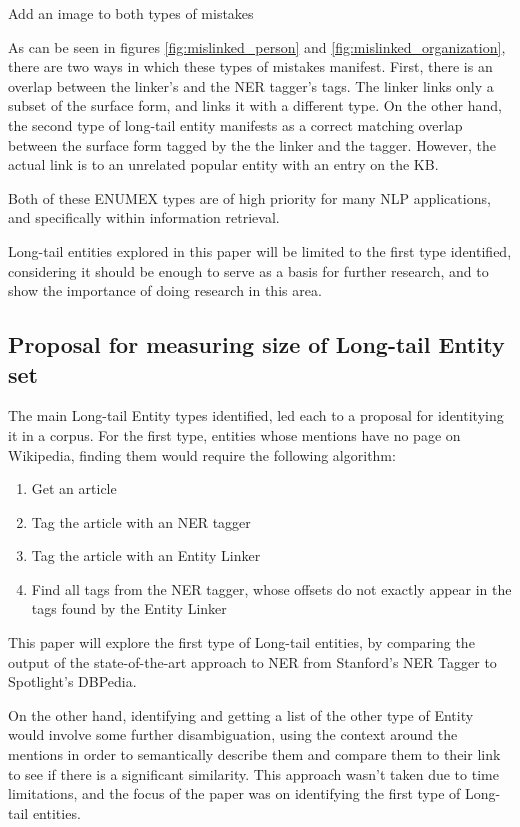 \todo Add an image to both types of mistakes

As can be seen in figures \ref{fig:mislinked_person} and \ref{fig:mislinked_organization}, there are two ways in which these types of mistakes manifest.
First, there is an overlap between the linker's and the NER tagger's tags. The linker links only a subset of the surface form, and links it with a different type.
On the other hand, the second type of long-tail entity manifests as a correct matching overlap between the surface form tagged by the the linker and the tagger.
However, the actual link is to an unrelated popular entity with an entry on the KB. 

Both of these ENUMEX types are of high priority for many NLP applications, and specifically within information retrieval. 

Long-tail entities explored in this paper will be limited to the first type identified, considering it should be enough to serve as a basis for further research,
and to show the importance of doing research in this area. 


\subsection{Proposal for measuring size of Long-tail Entity set}
The main Long-tail Entity types identified, led each to a proposal for identitying it in a corpus. 
For the first type, entities whose mentions have no page on Wikipedia, finding them would require the following algorithm:
\begin{enumerate}
\item Get an article
\item Tag the article with an NER tagger
\item Tag the article with an Entity Linker
\item Find all tags from the NER tagger, whose offsets do not exactly appear in the tags found by the Entity Linker
\end{enumerate}
This paper will explore the first type of Long-tail entities, by comparing the output of the state-of-the-art approach to NER from Stanford's NER Tagger
to Spotlight's DBPedia.

On the other hand, identifying and getting a list of the other type of Entity would involve some further disambiguation,
using the context around the mentions in order to semantically describe them and compare them to their link to see if there is a significant similarity.
This approach wasn't taken due to time limitations, and the focus of the paper was on identifying the first type of Long-tail entities.

